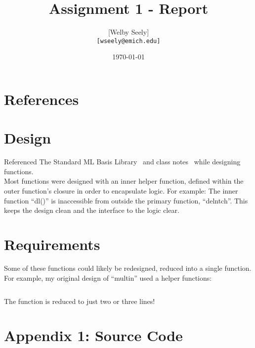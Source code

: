 \documentclass{article}
\title{Assignment 1 - Report}
\author{
    [Welby Seely] \\
    \texttt{[wseely@emich.edu]}
}
\date{\today}
\begin{document}
    \maketitle

    \section{References}\label{sec:references}
    
    \renewcommand{\refname}{} %
    

    \section{Design}\label{sec:design}
    Referenced The Standard ML Basis Library~\cite{sml_basis} and class notes~\cite{zhang_class_notes} while designing functions.
    \\
    Most functions were designed with an inner helper function, defined within the outer function's closure in order to encapsulate logic.
    For example:
    The inner function ``dl()'' is inaccessible from outside the primary function, ``delntch''.
    This keeps the design clean and the interface to the logic clear.

    \section{Requirements}\label{sec:difficulty}
    Some of these functions could likely be redesigned, reduced into a single function.
    For example, my original design of ``multin'' used a helper functions:
    \\
    \begin{lstlisting}[language=Python]
    \end{lstlisting}
    The function is reduced to just two or three lines!

    \section{Appendix 1: Source Code}\label{sec:appendix_1}
    \begin{lstlisting}

    \end{lstlisting}
\end{document}
